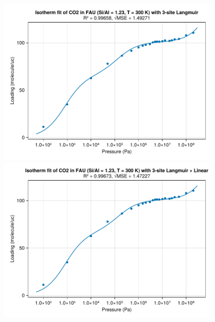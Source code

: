 \documentclass[main.tex]{subfiles}
\begin{document}
\begin{figure}\ContinuedFloat
	\begin{minipage}{0.49\columnwidth}
		\includegraphics[width=\columnwidth]{figures/isotherms/3-site Langmuir.pdf}
	\end{minipage}\hfill%
	\begin{minipage}{0.49\columnwidth}
		\includegraphics[width=\columnwidth]{figures/isotherms/3-site Langmuir + Linear.pdf}
	\end{minipage}


\end{figure}
\end{document}
